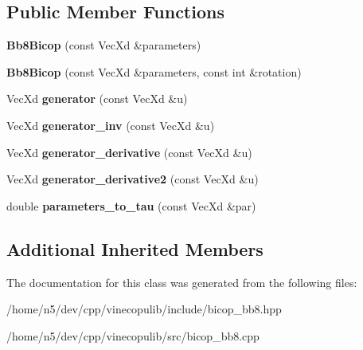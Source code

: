 \subsection*{Public Member Functions}
\begin{DoxyCompactItemize}
\item 
{\bfseries Bb8\+Bicop} (const Vec\+Xd \&parameters)\hypertarget{class_bb8_bicop_a13fc1d0023c12f94ab3c012b32f4b9bc}{}\label{class_bb8_bicop_a13fc1d0023c12f94ab3c012b32f4b9bc}

\item 
{\bfseries Bb8\+Bicop} (const Vec\+Xd \&parameters, const int \&rotation)\hypertarget{class_bb8_bicop_a1a6942067c4bbfe44293d71538d8d5ef}{}\label{class_bb8_bicop_a1a6942067c4bbfe44293d71538d8d5ef}

\item 
Vec\+Xd {\bfseries generator} (const Vec\+Xd \&u)\hypertarget{class_bb8_bicop_a1c319afe3c9857a9ed58719a348d6a8d}{}\label{class_bb8_bicop_a1c319afe3c9857a9ed58719a348d6a8d}

\item 
Vec\+Xd {\bfseries generator\+\_\+inv} (const Vec\+Xd \&u)\hypertarget{class_bb8_bicop_a578ab4567cec20f6eca4fcf420584e3e}{}\label{class_bb8_bicop_a578ab4567cec20f6eca4fcf420584e3e}

\item 
Vec\+Xd {\bfseries generator\+\_\+derivative} (const Vec\+Xd \&u)\hypertarget{class_bb8_bicop_a2d5495d2f0a5482449e50ff02b652f4a}{}\label{class_bb8_bicop_a2d5495d2f0a5482449e50ff02b652f4a}

\item 
Vec\+Xd {\bfseries generator\+\_\+derivative2} (const Vec\+Xd \&u)\hypertarget{class_bb8_bicop_a6e9bfaad15aa46a537028570f20d7f54}{}\label{class_bb8_bicop_a6e9bfaad15aa46a537028570f20d7f54}

\item 
double {\bfseries parameters\+\_\+to\+\_\+tau} (const Vec\+Xd \&par)\hypertarget{class_bb8_bicop_ad6856da75e5003053858b40d6ab84a38}{}\label{class_bb8_bicop_ad6856da75e5003053858b40d6ab84a38}

\end{DoxyCompactItemize}
\subsection*{Additional Inherited Members}


The documentation for this class was generated from the following files\+:\begin{DoxyCompactItemize}
\item 
/home/n5/dev/cpp/vinecopulib/include/bicop\+\_\+bb8.\+hpp\item 
/home/n5/dev/cpp/vinecopulib/src/bicop\+\_\+bb8.\+cpp\end{DoxyCompactItemize}

